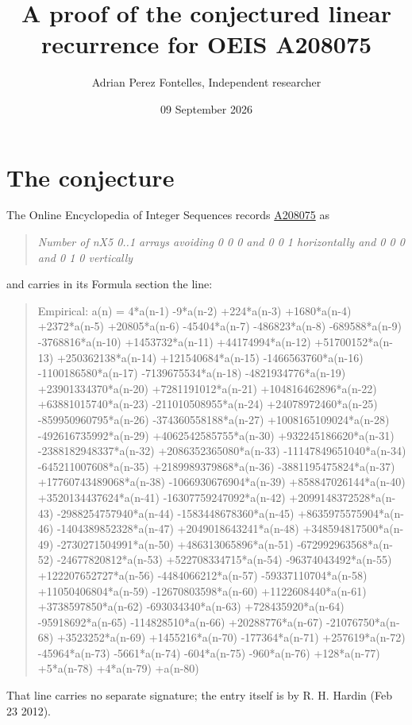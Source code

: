 \documentclass[11pt]{article}
\title{A proof of the conjectured linear recurrence for OEIS A208075}
\author{Adrian Perez Fontelles, Independent researcher}
\date{09 September 2026}
\theoremstyle{definition}
\begin{document}
\maketitle
\section{The conjecture}

The Online Encyclopedia of Integer Sequences records \href{https://oeis.org/A208075}{A208075} as

\begin{quote}\itshape Number of nX5 0..1 arrays avoiding 0 0 0 and 0 0 1 horizontally and 0 0 0 and 0 1 0 vertically\end{quote}

and carries in its Formula section the line:

\begin{quote}\ttfamily Empirical: a(n) = 4*a(n-1) -9*a(n-2) +224*a(n-3) +1680*a(n-4) +2372*a(n-5) +20805*a(n-6) -45404*a(n-7) -486823*a(n-8) -689588*a(n-9) -3768816*a(n-10) +1453732*a(n-11) +44174994*a(n-12) +51700152*a(n-13) +250362138*a(n-14) +121540684*a(n-15) -1466563760*a(n-16) -1100186580*a(n-17) -7139675534*a(n-18) -4821934776*a(n-19) +23901334370*a(n-20) +7281191012*a(n-21) +104816462896*a(n-22) +63881015740*a(n-23) -211010508955*a(n-24) +24078972460*a(n-25) -859950960795*a(n-26) -374360558188*a(n-27) +1008165109024*a(n-28) -492616735992*a(n-29) +4062542585755*a(n-30) +932245186620*a(n-31) -2388182948337*a(n-32) +2086352365080*a(n-33) -11147849651040*a(n-34) -645211007608*a(n-35) +2189989379868*a(n-36) -3881195475824*a(n-37) +17760743489068*a(n-38) -1066930676904*a(n-39) +858847026144*a(n-40) +3520134437624*a(n-41) -16307759247092*a(n-42) +2099148372528*a(n-43) -2988254757940*a(n-44) -1583448678360*a(n-45) +8635975575904*a(n-46) -1404389852328*a(n-47) +2049018643241*a(n-48) +348594817500*a(n-49) -2730271504991*a(n-50) +486313065896*a(n-51) -672992963568*a(n-52) -24677820812*a(n-53) +522708334715*a(n-54) -96374043492*a(n-55) +122207652727*a(n-56) -4484066212*a(n-57) -59337110704*a(n-58) +11050406804*a(n-59) -12670803598*a(n-60) +1122608440*a(n-61) +3738597850*a(n-62) -693034340*a(n-63) +728435920*a(n-64) -95918692*a(n-65) -114828510*a(n-66) +20288776*a(n-67) -21076750*a(n-68) +3523252*a(n-69) +1455216*a(n-70) -177364*a(n-71) +257619*a(n-72) -45964*a(n-73) -5661*a(n-74) -604*a(n-75) -960*a(n-76) +128*a(n-77) +5*a(n-78) +4*a(n-79) +a(n-80)\end{quote}

That line carries no separate signature; the entry itself is by R. H. Hardin (Feb 23 2012).
\end{document}
